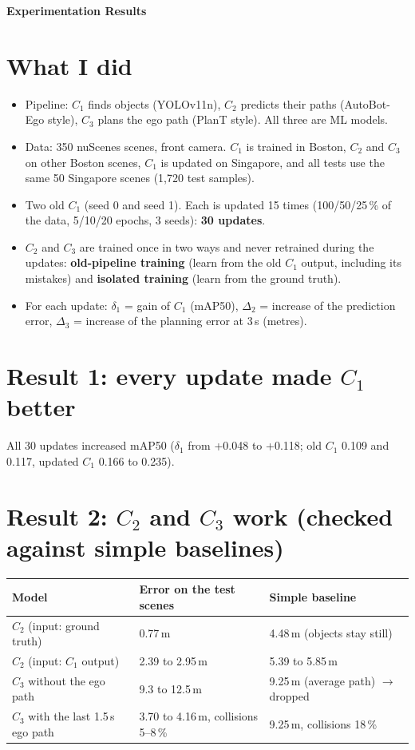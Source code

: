 \documentclass[10pt,a4paper]{article}
\begin{document}
{\Large\bfseries Experimentation Results}

\section*{What I did}
\begin{itemize}\setlength{\itemsep}{1pt}
\item Pipeline: $C_1$ finds objects (YOLOv11n), $C_2$ predicts their paths (AutoBot-Ego style), $C_3$ plans the ego path (PlanT style). All three are ML models.
\item Data: 350 nuScenes scenes, front camera. $C_1$ is trained in Boston, $C_2$ and $C_3$ on other Boston scenes, $C_1$ is updated on Singapore, and all tests use the same 50 Singapore scenes (1{,}720 test samples).
\item Two old $C_1$ (seed 0 and seed 1). Each is updated 15 times (100/50/25\,\% of the data, 5/10/20 epochs, 3 seeds): \textbf{30 updates}.
\item $C_2$ and $C_3$ are trained once in two ways and never retrained during the updates:
\textbf{old-pipeline training} (learn from the old $C_1$ output, including its mistakes) and
\textbf{isolated training} (learn from the ground truth).
\item For each update: $\delta_1$ = gain of $C_1$ (mAP50), $\Delta_2$ = increase of the prediction error, $\Delta_3$ = increase of the planning error at 3\,s (metres).
\end{itemize}

\section*{Result 1: every update made $C_1$ better}
All 30 updates increased mAP50 ($\delta_1$ from +0.048 to +0.118; old $C_1$ 0.109 and 0.117, updated $C_1$ 0.166 to 0.235).

\section*{Result 2: $C_2$ and $C_3$ work (checked against simple baselines)}
\begin{tabular}{lll}\toprule
Model & Error on the test scenes & Simple baseline\\\midrule
$C_2$ (input: ground truth) & 0.77\,m & 4.48\,m (objects stay still)\\
$C_2$ (input: $C_1$ output) & 2.39 to 2.95\,m & 5.39 to 5.85\,m\\
$C_3$ without the ego path & 9.3 to 12.5\,m & 9.25\,m (average path) $\rightarrow$ dropped\\
$C_3$ with the last 1.5\,s ego path & 3.70 to 4.16\,m, collisions 5--8\,\% & 9.25\,m, collisions 18\,\%\\\bottomrule
\end{tabular}
\end{document}
